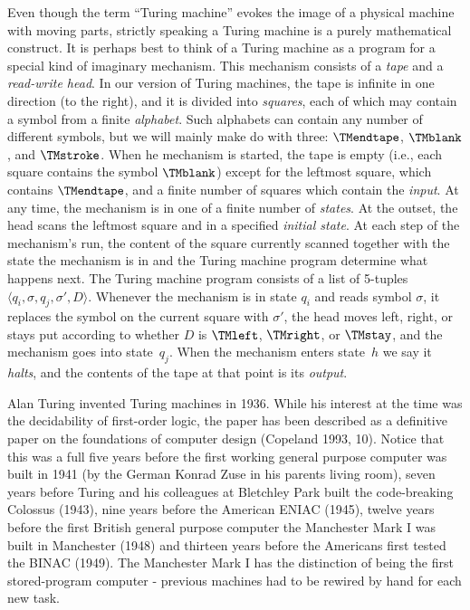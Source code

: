 \documentclass[../../include/open-logic-section]{subfiles}
\begin{document}

\begin{explain}
Even though the term ``Turing machine'' evokes the image of a physical
machine with moving parts, strictly speaking a Turing machine is a
purely mathematical construct.  It is perhaps best to think of a
Turing machine as a program for a special kind of imaginary mechanism.
This mechanism consists of a \emph{tape} and a \emph{read-write head}.
In our version of Turing machines, the tape is infinite in one
direction (to the right), and it is divided into \emph{squares}, each
of which may contain a symbol from a finite \emph{alphabet}.  Such
alphabets can contain any number of different symbols, but we will
mainly make do with three: $\TMendtape$, $\TMblank$, and
$\TMstroke$.  When he mechanism is started, the tape is empty (i.e., each
square contains the symbol $\TMblank$) except for the
leftmost square, which contains $\TMendtape$, and a finite number
of squares which contain the \emph{input}.  At any time, the mechanism
is in one of a finite number of \emph{states}.  At the outset, the
head scans the leftmost square and in a specified \emph{initial
  state}.  At each step of the mechanism's run, the content of the
square currently scanned together with the state the mechanism is in
and the Turing machine program determine what happens next.  The Turing
machine program consists of a list of 5-tuples $\langle q_i, \sigma,
q_j, \sigma', D\rangle$.  Whenever the mechanism is in state $q_i$ and
reads symbol $\sigma$, it replaces the symbol on the current square
with $\sigma'$, the head moves left, right, or stays put according to
whether $D$ is $\TMleft$, $\TMright$, or $\TMstay$, and the mechanism goes
into
state~$q_j$.  When the mechanism enters state~$h$ we say it
\emph{halts}, and the contents of the tape at that point is its
\emph{output}.

Alan Turing invented Turing machines in 1936. While his interest at the
time was the decidability of first-order logic, the paper has been
described as a definitive paper on the foundations of computer design
(Copeland 1993, 10). Notice that this was a full five years before the
first working general purpose computer was built in 1941 (by the German
Konrad Zuse in his parents living room), seven years before Turing and his
colleagues at Bletchley Park built the code-breaking Colossus (1943), nine
years before the American ENIAC (1945), twelve years before the first
British general purpose computer the Manchester Mark I was built in
Manchester (1948) and thirteen years before the Americans first tested the
BINAC (1949). The Manchester Mark I has the distinction of being the first
stored-program computer - previous machines had to be rewired by hand for
each new task.
\end{explain}
\end{document}
